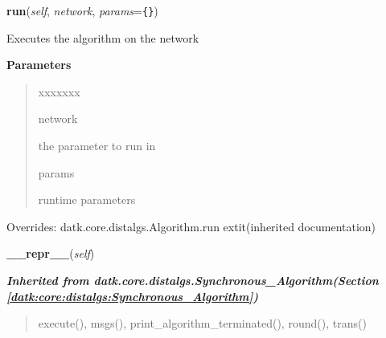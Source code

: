 \hspace{.8\funcindent}\begin{boxedminipage}{\funcwidth}

    \raggedright \textbf{run}(\textit{self}, \textit{network}, \textit{params}={\tt \texttt{\{}\texttt{\}}})

\setlength{\parskip}{2ex}
    Executes the algorithm on the network

\setlength{\parskip}{1ex}
      \textbf{Parameters}
      \vspace{-1ex}

      \begin{quote}
        \begin{Ventry}{xxxxxxx}

          \item[network]

          the parameter to run in

          \item[params]

          runtime parameters

        \end{Ventry}

      \end{quote}

      Overrides: datk.core.distalgs.Algorithm.run 	extit{(inherited documentation)}

    \end{boxedminipage}

    \label{datk:core:distalgs:Compose:__repr__}

    \vspace{0.5ex}

\hspace{.8\funcindent}\begin{boxedminipage}{\funcwidth}

    \raggedright \textbf{\_\_repr\_\_}(\textit{self})

\setlength{\parskip}{2ex}
\setlength{\parskip}{1ex}
    \end{boxedminipage}


\large{\textbf{\textit{Inherited from datk.core.distalgs.Synchronous\_Algorithm\textit{(Section \ref{datk:core:distalgs:Synchronous_Algorithm})}}}}

\begin{quote}
execute(), msgs(), print\_algorithm\_terminated(), round(), trans()
\end{quote}

